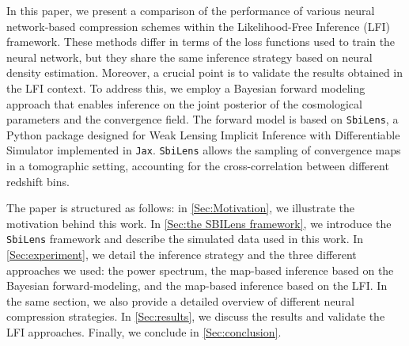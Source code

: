 \documentclass{aa}
\begin{document}
In this paper, we present a comparison of the performance of various neural network-based compression schemes within the Likelihood-Free Inference (LFI) framework. These methods differ in terms of the loss functions used to train the neural network, but they share the same inference strategy based on neural density estimation. Moreover, a crucial point is to validate the results obtained in the LFI context. To address this, we employ a Bayesian forward modeling approach that enables inference on the joint posterior of the cosmological parameters and the convergence field. The forward model is based on \texttt{SbiLens}, a Python package designed for Weak Lensing Implicit Inference with Differentiable Simulator implemented in \texttt{Jax}. \texttt{SbiLens} allows the sampling of convergence maps in a tomographic setting, accounting for the cross-correlation between different redshift bins.



The paper is structured as follows: in \autoref{Sec:Motivation}, we illustrate the motivation behind this work. In \autoref{Sec:the SBILens framework}, we introduce the \texttt{SbiLens} framework and describe the simulated data used in this work. In \autoref{Sec:experiment}, we detail the inference strategy and the three different approaches we used: the power spectrum, the map-based inference based on the Bayesian forward-modeling, and the map-based inference based on the LFI. In the same section, we also provide a detailed overview of different neural compression strategies. In \autoref{Sec:results}, we discuss the results and validate the LFI approaches. Finally, we conclude in \autoref{Sec:conclusion}. 







\end{document}
